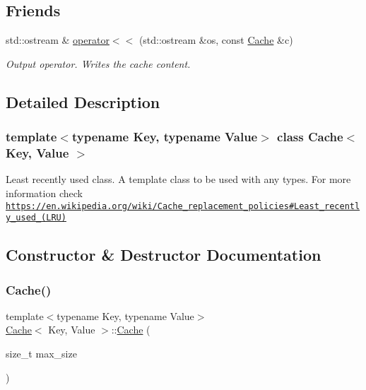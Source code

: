 \subsection*{Friends}
\begin{DoxyCompactItemize}
\item 
\mbox{\label{classCache_a11049cc49065d8bad3f6154e155922f1}} 
std\+::ostream \& \hyperlink{classCache_a11049cc49065d8bad3f6154e155922f1}{operator$<$$<$} (std\+::ostream \&os, const \hyperlink{classCache}{Cache} \&c)
\begin{DoxyCompactList}\small\item\em Output operator. Writes the cache content. \end{DoxyCompactList}\end{DoxyCompactItemize}


\subsection{Detailed Description}
\subsubsection*{template$<$typename Key, typename Value$>$\newline
class Cache$<$ Key, Value $>$}

Least recently used class. A template class to be used with any types. For more information check \href{https://en.wikipedia.org/wiki/Cache_replacement_policies#Least_recently_used_(LRU)}{\tt https\+://en.\+wikipedia.\+org/wiki/\+Cache\+\_\+replacement\+\_\+policies\#\+Least\+\_\+recently\+\_\+used\+\_\+(\+L\+R\+U)} 

\subsection{Constructor \& Destructor Documentation}
\mbox{\label{classCache_aff01185fbb5b12ac5e139444e092b471}} 
\subsubsection{\texorpdfstring{Cache()}{Cache()}}
{\footnotesize\ttfamily template$<$typename Key, typename Value$>$ \\
\hyperlink{classCache}{Cache}$<$ Key, Value $>$\+::\hyperlink{classCache}{Cache} (\begin{DoxyParamCaption}\item[{size\+\_\+t}]{max\+\_\+size }\end{DoxyParamCaption})\hspace{0.3cm}{\ttfamily [inline]}}



